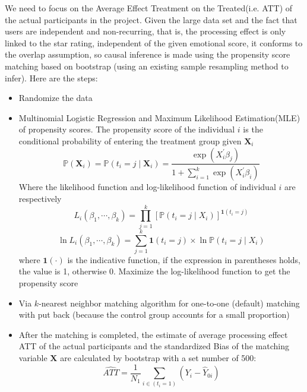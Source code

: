 \documentclass{mcmthesis}
\begin{document}
We need to focus on the Average Effect Treatment on the Treated(i.e. ATT) of the actual participants in the project. Given the large data set and the fact that users are independent and non-recurring, that is, the processing effect is only linked to the star rating, independent of the given emotional score, it conforms to the overlap assumption, so causal inference is made using the propensity score matching based on bootstrap (using an existing sample resampling method to infer). Here are the steps:
\begin{itemize}
\item Randomize the data
\item Multinomial Logistic Regression and Maximum Likelihood Estimation(MLE) of propensity scores. The propensity score of the individual $i$ is the conditional probability of entering the treatment group given $\boldsymbol{X}_i$
\begin{equation}
\mathbb{P}\left( \boldsymbol{X}_i \right) =\mathbb{P}\left( t_i=j\mid \boldsymbol{X}_i \right) =\frac{\exp \left( X_{i}^{'}\beta _j \right)}{1+\sum_{i=1}^k{\exp \left( X_{i}^{'}\beta _i \right)}} 
\end{equation}
Where the likelihood function and log-likelihood function of individual $i$ are respectively
\begin{equation}
L_i\left( \beta _1,\cdots ,\beta _k \right) =\prod_{j=1}^k{\left[ \mathbb{P}\left( t_i=j\mid X_i \right) \right] ^{\boldsymbol{1}\left( t_i=j \right)}} 
\end{equation}
\begin{equation}
\ln L_i\left( \beta _1,\cdots ,\beta _k \right) =\sum_{j=1}^k{\boldsymbol{1}\left( t_i=j \right) \times \ln \mathbb{P}\left( t_i=j\mid X_i \right)}
\end{equation}
where $\boldsymbol{1}\left(\cdot\right)$ is the indicative function, if the expression in parentheses holds, the value is 1, otherwise 0. Maximize the log-likelihood function to get the propensity score
\item Via $ k $-nearest neighbor matching algorithm for one-to-one (default) matching with put back (because the control group accounts for a small proportion)
\item After the matching is completed, the estimate of average processing effect ATT of the actual participants and the standardized Bias of the matching variable $\boldsymbol{X}$ are calculated by bootstrap with a set number of 500:
\begin{equation}
\widehat{ATT}=\frac{1}{N_1}\sum_{i\in \left( t_i=1 \right)}{\left( Y_i-\hat{Y}_{0i} \right)}

\end{equation}
\end{itemize}
\end{document}
